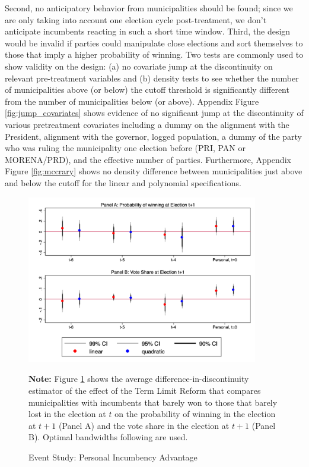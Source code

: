 \documentclass[12pt]{amsart}
\numberwithin{equation}{section}
\theoremstyle{definition}
\theoremstyle{definition}
\theoremstyle{definition}
\begin{document}
Second, no anticipatory behavior from municipalities should be found; since we are only taking into account one election cycle post-treatment, we don't anticipate incumbents reacting in such a short time window. Third, the design would be invalid if parties could manipulate close elections and sort themselves to those that imply a higher probability of winning. Two tests are commonly used to show validity on the design: (a) no covariate jump at the discontinuity on relevant pre-treatment variables and (b) density tests to see whether the number of municipalities above (or below) the cutoff threshold is significantly different from the number of municipalities below (or above). Appendix Figure \ref{fig:jump_covariates} shows evidence of no significant jump at the discontinuity of various pretreatment covariates including a dummy on the alignment with the President, alignment with the governor, logged population, a dummy of the party who was ruling the municipality one election before (PRI, PAN or MORENA/PRD), and the effective number of parties. Furthermore, Appendix Figure \ref{fig:mccrary} shows no density difference between municipalities just above and below the cutoff for the linear and polynomial specifications. 

\begin{figure}[H]   
\centering    
 \caption{Event Study: Personal Incumbency Advantage}
 \label{fig:event_study_personal}
\includegraphics[width=0.9\textwidth]{Figures_incumbency/event_study.png}
       \captionsetup{justification=centering}
         
 \textbf{Note:} Figure \ref{fig:event_study_personal} shows the average difference-in-discontinuity estimator of the effect of the Term Limit Reform that compares municipalities with incumbents that barely won to those that barely lost in the election at $t$ on the probability of winning in the election at $t+1$ (Panel A) and the vote share in the  election at $t+1$ (Panel B). Optimal bandwidths following \citet{calonicoetal_2014} are used. 
  
\end{figure}  
 
\end{document}
